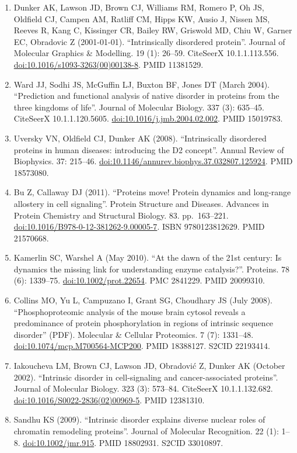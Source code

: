 \documentclass[
]{book}
\begin{document}
\begin{enumerate}
\item
  Dunker AK, Lawson JD, Brown CJ, Williams RM, Romero P, Oh JS, Oldfield CJ, Campen AM, Ratliff CM, Hipps KW, Ausio J, Nissen MS, Reeves R, Kang C, Kissinger CR, Bailey RW, Griswold MD, Chiu W, Garner EC, Obradovic Z (2001-01-01). ``Intrinsically disordered protein''. Journal of Molecular Graphics \& Modelling. 19 (1): 26--59. CiteSeerX 10.1.1.113.556. \url{doi:10.1016/s1093-3263(00)00138-8}. PMID 11381529.
\item
  Ward JJ, Sodhi JS, McGuffin LJ, Buxton BF, Jones DT (March 2004). ``Prediction and functional analysis of native disorder in proteins from the three kingdoms of life''. Journal of Molecular Biology. 337 (3): 635--45. CiteSeerX 10.1.1.120.5605. \url{doi:10.1016/j.jmb.2004.02.002}. PMID 15019783.
\item
  Uversky VN, Oldfield CJ, Dunker AK (2008). ``Intrinsically disordered proteins in human diseases: introducing the D2 concept''. Annual Review of Biophysics. 37: 215--46. \url{doi:10.1146/annurev.biophys.37.032807.125924}. PMID 18573080.
\item
  Bu Z, Callaway DJ (2011). ``Proteins move! Protein dynamics and long-range allostery in cell signaling''. Protein Structure and Diseases. Advances in Protein Chemistry and Structural Biology. 83. pp.~163--221. \url{doi:10.1016/B978-0-12-381262-9.00005-7}. ISBN 9780123812629. PMID 21570668.
\item
  Kamerlin SC, Warshel A (May 2010). ``At the dawn of the 21st century: Is dynamics the missing link for understanding enzyme catalysis?''. Proteins. 78 (6): 1339--75. \url{doi:10.1002/prot.22654}. PMC 2841229. PMID 20099310.
\item
  Collins MO, Yu L, Campuzano I, Grant SG, Choudhary JS (July 2008). ``Phosphoproteomic analysis of the mouse brain cytosol reveals a predominance of protein phosphorylation in regions of intrinsic sequence disorder'' (PDF). Molecular \& Cellular Proteomics. 7 (7): 1331--48. \url{doi:10.1074/mcp.M700564-MCP200}. PMID 18388127. S2CID 22193414.
\item
  Iakoucheva LM, Brown CJ, Lawson JD, Obradović Z, Dunker AK (October 2002). ``Intrinsic disorder in cell-signaling and cancer-associated proteins''. Journal of Molecular Biology. 323 (3): 573--84. CiteSeerX 10.1.1.132.682. \url{doi:10.1016/S0022-2836(02)00969-5}. PMID 12381310.
\item
  Sandhu KS (2009). ``Intrinsic disorder explains diverse nuclear roles of chromatin remodeling proteins''. Journal of Molecular Recognition. 22 (1): 1--8. \url{doi:10.1002/jmr.915}. PMID 18802931. S2CID 33010897.

\end{enumerate}
\end{document}
